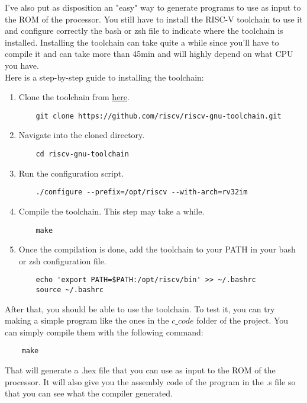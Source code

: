 I've also put as disposition an "easy" way to generate programs to use as input to the ROM of the processor. You still have to install 
the RISC-V toolchain to use it and configure correctly the bash or zsh file to indicate where the toolchain is installed.
Installing the toolchain can take quite a while since you'll have to compile it and can take more than 45min and will highly depend
on what CPU you have. \\

Here is a step-by-step guide to installing the toolchain:

\begin{enumerate}[label={\textbullet}]
    \item Clone the toolchain from \href{https://github.com/riscv-collab/riscv-gnu-toolchain}{here}.
    
    \begin{verbatim}
    git clone https://github.com/riscv/riscv-gnu-toolchain.git
    \end{verbatim}
    
    \item Navigate into the cloned directory.
    
    \begin{verbatim}
    cd riscv-gnu-toolchain
    \end{verbatim}
    
    \item Run the configuration script.

    \begin{verbatim}
    ./configure --prefix=/opt/riscv --with-arch=rv32im
    \end{verbatim}
    
    \item Compile the toolchain. This step may take a while.
    
    \begin{verbatim}
    make
    \end{verbatim}
    
    \item Once the compilation is done, add the toolchain to your PATH in your bash or zsh configuration file.

    \begin{verbatim}
    echo 'export PATH=$PATH:/opt/riscv/bin' >> ~/.bashrc
    source ~/.bashrc
    \end{verbatim}
\end{enumerate}

After that, you should be able to use the toolchain. To test it, you can try making a simple program like the ones in the 
$c\_code$ folder of the project. You can simply compile them with the following command:

\begin{verbatim}
    make
\end{verbatim}

That will generate a .hex file that you can use as input to the ROM of the processor. It will also give you the assembly
code of the program in the .s file so that you can see what the compiler generated. \\